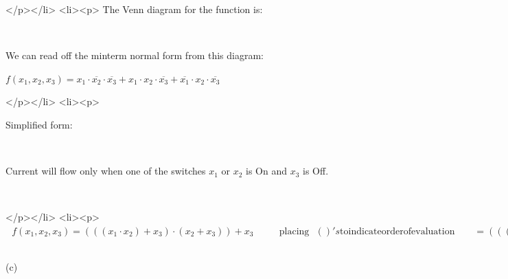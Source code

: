 </p></li>
<li><p> The Venn diagram for the function is:

\begin{doublespace}
\noindent\(\)
\end{doublespace}



      We can read off the minterm normal form from this diagram:



\(f\left(x_1,x_2,x_3\right)=x_1\cdot \overline{x_2}\cdot \overline{x_3}+x_1\cdot x_2\cdot \overline{x_3}+\overline{x_1}\cdot x_2\cdot \overline{x_3}\)

</p></li>
<li><p>



Simplified form:

\begin{doublespace}
\noindent\(\)
\end{doublespace}



Current will flow only when one of the switches \(x_1\) or \(x_2\) is On and \(x_3\) is Off.

\begin{doublespace}
\noindent\(\)
\end{doublespace}

</p></li>
<li><p>  \(\text{   }f \left(x_1,x_2,x_3\right)=\left(\left(\left(x_1\cdot x_2\right)+x_3\right)\cdot \left(x_2+x_3\right)\right)+x_3\text{$\quad \quad
$        }\text{placing}\text{  }( )'s \text{to} \text{indicate} \text{order} \text{of} \text{evaluation}\quad \quad =\left(\left(\left(x_1\cdot
x_2\right)\cdot \left(x_2\right)\right)+x_3\right)+x_3\text{$\quad \quad $            }\text{by} \text{the} \text{distributive} \text{law} \text{of}
+ \text{over} \cdot \text{             }=\left(x_1\cdot \left(x_2\cdot x_2\right)\right)+\left(x_3+x_3\right)\text{$\quad \quad $       
    }\text{by} \text{the} \text{associative} \text{laws} \text{of} \cdot  \text{and} +\text{             }=\left(x_1\cdot x_2\right)+x_3\text{$\quad
\quad $            }\text{by} \text{the} \text{idempotent} \text{laws} \text{of} \cdot  \text{and} +\)



\\
\hspace*{0.5ex} (c)

\begin{doublespace}
\noindent\(\)
\end{doublespace}



